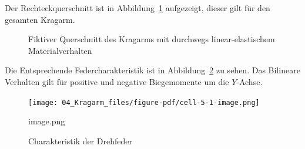 \documentclass[
  11pt,
  letterpaper,
]{scrreprt}
\begin{document}
Der Rechteckquerschnitt ist in Abbildung~\ref{fig-qs-kragarm}
aufgezeigt, dieser gilt für den gesamten Kragarm.

\begin{figure}[H]


\caption{\label{fig-qs-kragarm}Fiktiver Querschnitt des Kragarms mit
durchwegs linear-elastischem Materialverhalten}

\end{figure}%

Die Entsprechende Federcharakteristik ist in
Abbildung~\ref{fig-springcharacteristic} zu sehen. Das Bilineare
Verhalten gilt für positive und negative Biegemomente um die
\(Y\)-Achse.

\begin{figure}[H]

{\centering \texttt{[image: 04\_Kragarm\_files/figure-pdf/cell-5-1-image.png]}

}

\caption{image.png}

\end{figure}%

\begin{figure}[H]


\caption{\label{fig-springcharacteristic}Charakteristik der Drehfeder}

\end{figure}%
\end{document}
